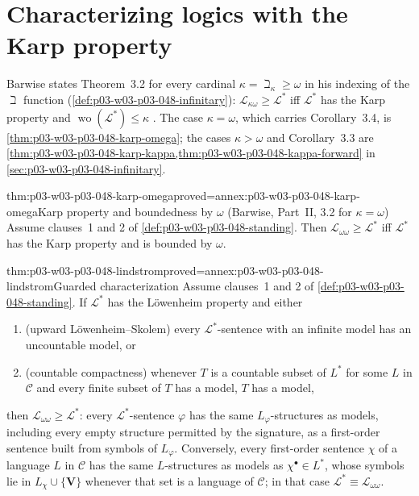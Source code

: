 \section{Characterizing logics with the Karp property}
\label{sec:p03-w03-p03-048-characterizing}

Barwise states Theorem~3.2 for every cardinal \(\kappa=\beth_\kappa\geq\omega\)
in his indexing of the \(\beth\) function
(\cref{def:p03-w03-p03-048-infinitary}): \(\mathcal L_{\kappa\omega}\geq
\mathcal L^{\ast}\) iff \(\mathcal L^{\ast}\) has the Karp property and
\(\operatorname{wo}(\mathcal L^{\ast})\leq\kappa\) \cite[Part~II, \S3, 3.2,
p.~257]{Barwise1974Axioms}.  The case \(\kappa=\omega\), which carries
Corollary~3.4, is \cref{thm:p03-w03-p03-048-karp-omega}; the cases
\(\kappa>\omega\) and Corollary~3.3 are
\cref{thm:p03-w03-p03-048-karp-kappa,thm:p03-w03-p03-048-kappa-forward} in
\cref{sec:p03-w03-p03-048-infinitary}.

\begin{hbtheorem}{thm:p03-w03-p03-048-karp-omega}{proved=annex:p03-w03-p03-048-karp-omega}{Karp property and boundedness by \(\omega\) (Barwise, Part~II, 3.2 for \(\kappa=\omega\))}
Assume clauses~1 and 2 of \cref{def:p03-w03-p03-048-standing}.  Then
\(\mathcal L_{\omega\omega}\geq\mathcal L^{\ast}\) iff \(\mathcal L^{\ast}\)
has the Karp property and is bounded by \(\omega\).
\end{hbtheorem}

\begin{hbcorollary}{thm:p03-w03-p03-048-lindstrom}{proved=annex:p03-w03-p03-048-lindstrom}{Guarded characterization}
Assume clauses~1 and 2 of \cref{def:p03-w03-p03-048-standing}.  If
\(\mathcal L^{\ast}\) has the L\"owenheim property and either
\begin{enumerate}
\item[(a)] (upward L\"owenheim--Skolem) every \(\mathcal L^{\ast}\)-sentence
      with an infinite model has an uncountable model, or
\item[(b)] (countable compactness) whenever \(T\) is a countable subset of
      \(L^{\ast}\) for some \(L\) in \(\mathcal C\) and every finite subset
      of \(T\) has a model, \(T\) has a model,
\end{enumerate}
then \(\mathcal L_{\omega\omega}\geq\mathcal L^{\ast}\): every
\(\mathcal L^{\ast}\)-sentence \(\varphi\) has the same
\(L_\varphi\)-structures as models, including every empty structure permitted by the signature,
as a first-order sentence built from symbols of \(L_\varphi\).  Conversely,
every first-order sentence \(\chi\) of a language \(L\) in \(\mathcal C\) has
the same \(L\)-structures as models as \(\chi^{\bullet}\in L^{\ast}\), whose
symbols lie in \(L_\chi\cup\{\mathbf V\}\) whenever that set is a language of
\(\mathcal C\); in that case \(\mathcal L^{\ast}\equiv\mathcal L_{\omega\omega}\).
\end{hbcorollary}

